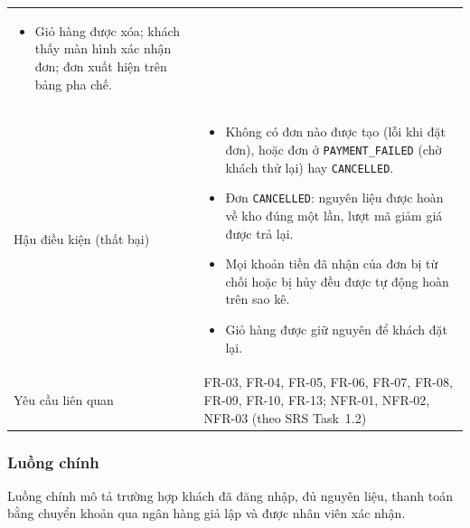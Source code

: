 \begin{longtable}{@{}p{3.6cm}p{12.4cm}@{}}
\begin{itemize}[leftmargin=*]
    \item Giỏ hàng được xóa; khách thấy màn hình xác nhận đơn; đơn xuất hiện trên bảng pha chế.
  \end{itemize} \\
Hậu điều kiện (thất bại) &
  \begin{itemize}[leftmargin=*]
    \item Không có đơn nào được tạo (lỗi khi đặt đơn), hoặc đơn ở \texttt{PAYMENT\_FAILED} (chờ khách thử lại) hay \texttt{CANCELLED}.
    \item Đơn \texttt{CANCELLED}: nguyên liệu được hoàn về kho đúng một lần, lượt mã giảm giá được trả lại.
    \item Mọi khoản tiền đã nhận của đơn bị từ chối hoặc bị hủy đều được tự động hoàn trên sao kê.
    \item Giỏ hàng được giữ nguyên để khách đặt lại.
  \end{itemize} \\
Yêu cầu liên quan & FR-03, FR-04, FR-05, FR-06, FR-07, FR-08, FR-09, FR-10, FR-13; NFR-01, NFR-02, NFR-03 (theo SRS Task~1.2) \\
\bottomrule
\end{longtable}

\subsubsection{Luồng chính}

Luồng chính mô tả trường hợp khách đã đăng nhập, đủ nguyên liệu, thanh toán bằng chuyển khoản qua ngân hàng giả lập và được nhân viên xác nhận.

